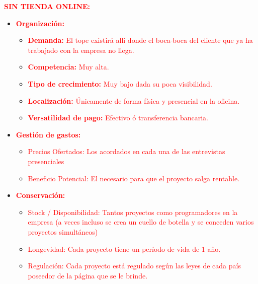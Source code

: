 \documentclass{article}
\begin{document}
\begin{itemize}
\textcolor{Red}{\textbf{SIN TIENDA ONLINE:}}
\begin{itemize}
\item \textcolor{Red}{\textbf{Organización:}}
\begin{itemize}
\item \textcolor{Red}{\textbf{Demanda:} El tope existirá allí donde el boca-boca del cliente que ya ha trabajado con la empresa no llega.}
\item \textcolor{Red}{\textbf{Competencia:} Muy alta.}
\item \textcolor{Red}{\textbf{Tipo de crecimiento:} Muy bajo dada su poca visibilidad.}
\item \textcolor{Red}{\textbf{Localización:} Únicamente de forma física y presencial en la oficina.}
\item \textcolor{Red}{\textbf{Versatilidad de pago:} Efectivo ó transferencia bancaria. }
\end{itemize}
\item \textcolor{Red}{\textbf{Gestión de gastos:}}
\begin{itemize}
\item \textcolor{Red}{Precios Ofertados: Los acordados en cada una de las entrevistas presenciales}
\item \textcolor{Red}{Beneficio Potencial: El necesario para que el proyecto salga rentable.}
\end{itemize}
\item \textcolor{Red}{\textbf{Conservación:}}
\begin{itemize}
\item \textcolor{Red}{Stock / Disponibilidad: Tantos proyectos como programadores en la empresa (a veces incluso se crea un cuello de botella y se conceden varios proyectos simultáneos)}
\item \textcolor{Red}{Longevidad: Cada proyecto tiene un período de vida de 1 año.}
\item \textcolor{Red}{Regulación: Cada proyecto está regulado según las leyes de cada país poseedor de la página que se le brinde.}
\end{itemize}
\end{itemize}


\end{itemize}
\end{document}
